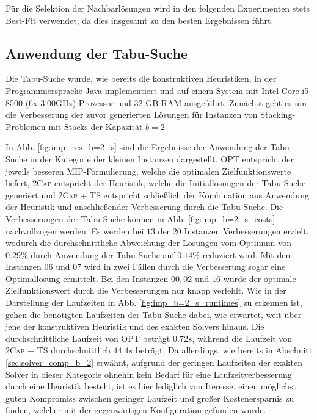 Für die Selektion der Nachbarlösungen wird in den folgenden Experimenten stets Best-Fit verwendet,
da dies insgesamt zu den besten Ergebnissen führt.

\vfill
\pagebreak

\subsection{Anwendung der Tabu-Suche}
\label{sec:tabu_search_experiments}

Die Tabu-Suche wurde, wie bereits die konstruktiven Heuristiken, in der Programmiersprache Java implementiert und
auf einem System mit Intel Core i5-8500 (6x 3.00GHz) Prozessor und 32 GB RAM ausgeführt.
Zunächst geht es um die Verbesserung der zuvor generierten Lösungen für Instanzen von Stacking-Problemen
mit Stacks der Kapazität $b = 2$.

In Abb. \ref{fig:imp_res_b=2_s} sind die Ergebnisse der Anwendung der Tabu-Suche in der Kategorie
der kleinen Instanzen dargestellt. \textsc{OPT} entspricht der jeweils besseren MIP-Formulierung, welche die optimalen Zielfunktionswerte liefert, \textsc{2Cap} entspricht der Heuristik, welche die Initiallösungen der Tabu-Suche generiert und \textsc{2Cap + TS} entspricht schließlich der Kombination aus Anwendung der Heuristik und anschließender Verbesserung durch die Tabu-Suche. Die Verbesserungen der Tabu-Suche können in Abb. \ref{fig:imp_b=2_s_costs} nachvollzogen werden. Es werden bei $13$ der $20$ Instanzen Verbesserungen erzielt, wodurch die durchschnittliche Abweichung der Lösungen vom Optimum von $0.29 \%$ durch Anwendung der Tabu-Suche
auf $0.14 \%$ reduziert wird. Mit den Instanzen $06$ und $07$ wird in zwei Fällen durch die Verbesserung sogar eine Optimallösung ermittelt. Bei den Instanzen $00, 02$ und $16$ wurde der optimale Zielfunktionswert durch die Verbesserungen nur knapp verfehlt. Wie in der Darstellung der Laufzeiten in Abb. \ref{fig:imp_b=2_s_runtimes} zu erkennen ist, gehen die benötigten Laufzeiten der Tabu-Suche dabei, wie erwartet, weit über jene der konstruktiven Heuristik und des exakten Solvers hinaus. Die durchschnittliche Laufzeit von \textsc{OPT} beträgt $0.72s$, während
die Laufzeit von \textsc{2Cap + TS} durchschnittlich $44.4s$ beträgt. Da allerdings, wie bereits in Abschnitt \ref{sec:solver_comp_b=2} erwähnt, aufgrund der geringen Laufzeiten der exakten Solver in dieser Kategorie ohnehin kein Bedarf für eine Laufzeitverbesserung durch eine Heuristik besteht, ist es hier lediglich von Iteresse, einen möglichst guten Kompromiss zwischen geringer Laufzeit und großer Kostenersparnis zu finden, welcher mit der gegenwärtigen Konfiguration gefunden wurde.

